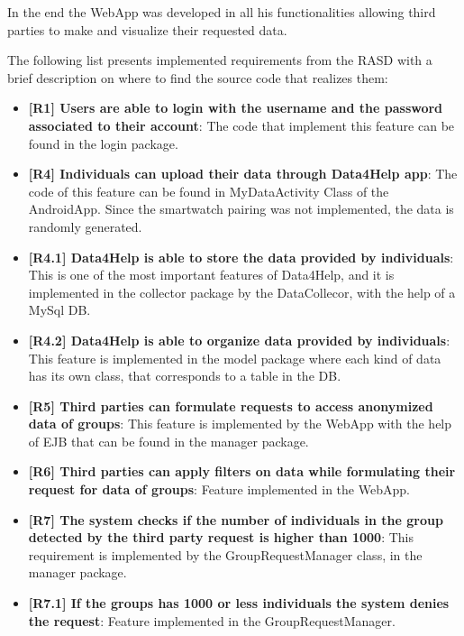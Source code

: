 \noindent
In the end the WebApp was developed in all his functionalities allowing third parties to make and visualize their requested data.
\vspace{1em}

\noindent
The following list presents implemented requirements from the RASD with a brief description on where to find the source code that realizes them:

\begin{itemize}
\item \textbf{[R1] Users are able to login with the username and the password associated to
their account}: The code that implement this feature can be found in the login package.

\item \textbf{[R4] Individuals can upload their data through Data4Help app}: The code of this feature can be found in MyDataActivity Class of the AndroidApp. Since the smartwatch pairing was not implemented, the data is randomly generated.

\item \textbf{[R4.1] Data4Help is able to store the data provided by individuals}: This is one of the most important features of Data4Help, and it is implemented in the collector package by the DataCollecor, with the help of a MySql DB.

\item \textbf{[R4.2] Data4Help is able to organize data provided by individuals}: This feature is implemented in the model package where each kind of data has its own class, that corresponds to a table in the DB.

\item \textbf{[R5] Third parties can formulate requests to access anonymized data of groups}: This feature is implemented by the WebApp with the help of EJB that can be found in the manager package.

\item \textbf{[R6] Third parties can apply filters on data while formulating their request for
data of groups}: Feature implemented in the WebApp.

\item \textbf{[R7] The system checks if the number of individuals in the group detected by
the third party request is higher than 1000}: This requirement is implemented by the GroupRequestManager class, in the manager package.

\item \textbf{[R7.1] If the groups has 1000 or less individuals the system denies the request}: Feature implemented in the GroupRequestManager.


\end{itemize}
